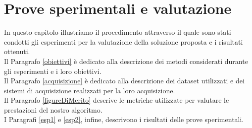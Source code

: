 \chapter{Prove sperimentali e valutazione}
\label{ProveSperimentali}
\thispagestyle{empty}

\noindent In questo capitolo illustriamo il procedimento attraverso il quale sono stati condotti gli esperimenti per la valutazione della soluzione proposta e i risultati ottenuti.\\
Il Paragrafo \ref{obiettivi} \`e dedicato alla descrizione dei metodi considerati durante gli esperimenti e i loro obiettivi.\\ 
Il Paragrafo \ref{acquisizione} \`e dedicato alla descrizione dei dataset utilizzati e dei sistemi di acquisizione realizzati per la loro acquisizione.\\
Il Paragrafo \ref{figureDiMerito} descrive le metriche utilizzate per valutare le prestazioni del nostro algoritmo.\\
I Paragrafi \ref{esp1} e \ref{esp2}, infine, descrivono i risultati delle prove sperimentali.
